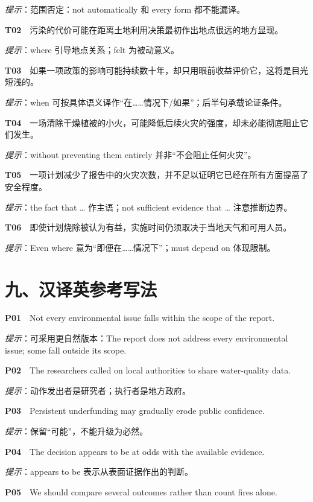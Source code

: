 \documentclass[a4paper,11pt,openany]{report}
\begin{document}
\emph{提示}：范围否定：not automatically 和 every form 都不能漏译。

\textbf{T02}　污染的代价可能在距离土地利用决策最初作出地点很远的地方显现。

\emph{提示}：where 引导地点关系；felt 为被动意义。

\textbf{T03}　如果一项政策的影响可能持续数十年，却只用眼前收益评价它，这将是目光短浅的。

\emph{提示}：when 可按具体语义译作``在\ldots\ldots 情况下/如果''；后半句承载论证条件。

\textbf{T04}　一场清除干燥植被的小火，可能降低后续火灾的强度，却未必能彻底阻止它们发生。

\emph{提示}：without preventing them entirely 并非``不会阻止任何火灾''。

\textbf{T05}　一项计划减少了报告中的火灾次数，并不足以证明它已经在所有方面提高了安全程度。

\emph{提示}：the fact that \ldots{} 作主语；not sufficient evidence that \ldots{} 注意推断边界。

\textbf{T06}　即使计划烧除被认为有益，实施时间仍须取决于当地天气和可用人员。

\emph{提示}：Even where 意为``即便在\ldots\ldots 情况下''；must depend on 体现限制。

\section{九、汉译英参考写法}\label{ux4e5dux6c49ux8bd1ux82f1ux53c2ux8003ux5199ux6cd5}

\textbf{P01}　Not every environmental issue falls within the scope of the report.

\emph{提示}：可采用更自然版本：The report does not address every environmental issue; some fall outside its scope.

\textbf{P02}　The researchers called on local authorities to share water-quality data.

\emph{提示}：动作发出者是研究者；执行者是地方政府。

\textbf{P03}　Persistent underfunding may gradually erode public confidence.

\emph{提示}：保留``可能''，不能升级为必然。

\textbf{P04}　The decision appears to be at odds with the available evidence.

\emph{提示}：appears to be 表示从表面证据作出的判断。

\textbf{P05}　We should compare several outcomes rather than count fires alone.
\end{document}
